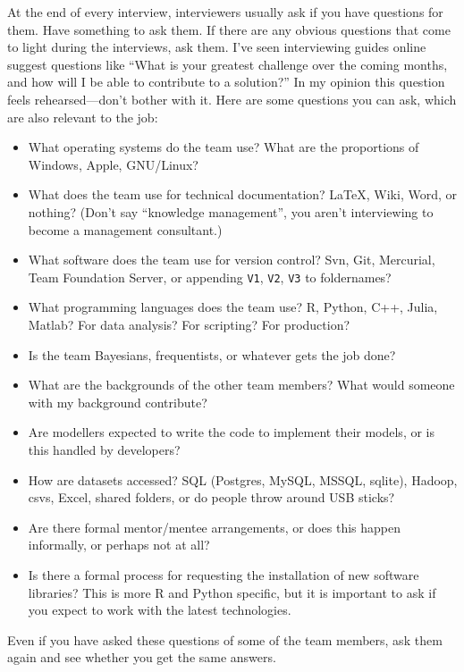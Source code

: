 \documentclass[a4paper]{article}
\begin{document}
At the end of every interview, interviewers usually ask if you have questions for them.
Have something to ask them.
If there are any obvious questions that come to light during the interviews, ask them.
I've seen interviewing guides online suggest questions like
``What is your greatest challenge over the coming months, and how will I be able to contribute to a solution?''
In my opinion this question feels rehearsed---don't bother with it.
Here are some questions you can ask, which are also relevant to the job:
\begin{itemize}
  \item What operating systems do the team use?
  What are the proportions of Windows, Apple, GNU/Linux?
  \item  What does the team use for technical documentation? LaTeX, Wiki, Word, or nothing? (Don't say ``knowledge management'', you aren't interviewing to become a management consultant.)
  \item  What software does the team use for version control? Svn, Git, Mercurial, Team Foundation Server, or appending
  \verb+V1+,
  \verb+V2+,
  \verb+V3+
  to foldernames?
  \item  What programming languages does the team use? R, Python, C++, Julia, Matlab?
  For data analysis? For scripting? For production?
  \item  Is the team Bayesians, frequentists, or whatever gets the job done?
  \item  What are the backgrounds of the other team members? What would someone with my background contribute?
  \item  Are modellers expected to write the code to implement their models, or is this handled by developers?
  \item  How are datasets accessed? SQL (Postgres, MySQL, MSSQL, sqlite), Hadoop, csvs, Excel, shared folders, or do people throw around USB sticks?
  \item  Are there formal mentor/mentee arrangements, or does this happen informally, or perhaps not at all?
  \item  Is there a formal process for requesting the installation of new software libraries?
  This is more R and Python specific, but it is important to ask if you expect to work with the latest technologies.
\end{itemize}
Even if you have asked these questions of some of the team members, ask them again and see whether you get the same answers.
\end{document}
